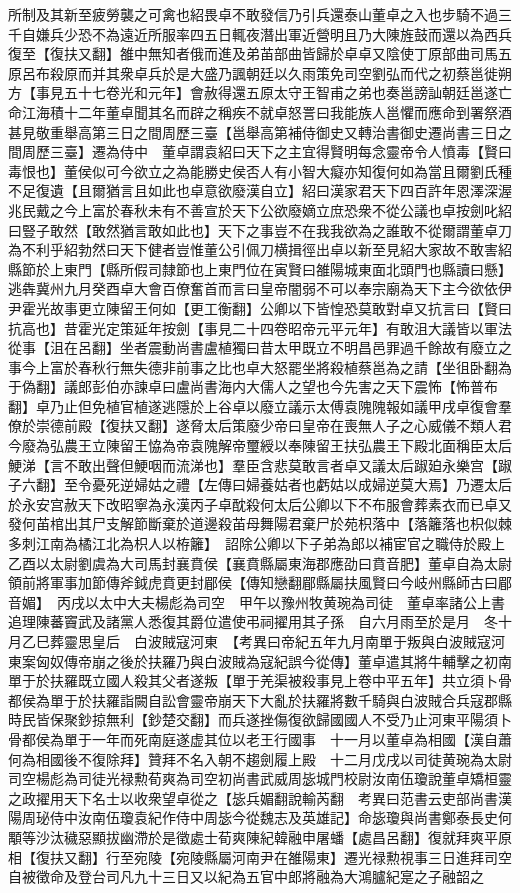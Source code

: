 所制及其新至疲勞襲之可禽也紹畏卓不敢發信乃引兵還泰山董卓之入也步騎不過三千自嫌兵少恐不為遠近所服率四五日輒夜潛出軍近營明且乃大陳旌鼓而還以為西兵復至【復扶又翻】雒中無知者俄而進及弟苖部曲皆歸於卓卓又陰使丁原部曲司馬五原呂布殺原而并其衆卓兵於是大盛乃諷朝廷以久雨策免司空劉弘而代之初蔡邕徙朔方【事見五十七卷光和元年】會赦得還五原太守王智甫之弟也奏邕謗訕朝廷邕遂亡命江海積十二年董卓聞其名而辟之稱疾不就卓怒詈曰我能族人邕懼而應命到署祭酒甚見敬重舉高第三日之間周歷三臺【邕舉高第補侍御史又轉治書御史遷尚書三日之間周歷三臺】遷為侍中　董卓謂袁紹曰天下之主宜得賢明每念靈帝令人憤毒【賢曰毒恨也】董侯似可今欲立之為能勝史侯否人有小智大癡亦知復何如為當且爾劉氏種不足復遺【且爾猶言且如此也卓意欲廢漢自立】紹曰漢家君天下四百許年恩澤深渥兆民戴之今上富於春秋未有不善宣於天下公欲廢嫡立庶恐衆不從公議也卓按劍叱紹曰豎子敢然【敢然猶言敢如此也】天下之事豈不在我我欲為之誰敢不從爾謂董卓刀為不利乎紹勃然曰天下健者豈惟董公引佩刀横揖徑出卓以新至見紹大家故不敢害紹縣節於上東門【縣所假司隸節也上東門位在寅賢曰雒陽城東面北頭門也縣讀曰懸】逃犇冀州九月癸酉卓大會百僚奮首而言曰皇帝闇弱不可以奉宗廟為天下主今欲依伊尹霍光故事更立陳留王何如【更工衡翻】公卿以下皆惶恐莫敢對卓又抗言曰【賢曰抗高也】昔霍光定策延年按劍【事見二十四卷昭帝元平元年】有敢沮大議皆以軍法從事【沮在呂翻】坐者震動尚書盧植獨曰昔太甲既立不明昌邑罪過千餘故有廢立之事今上富於春秋行無失德非前事之比也卓大怒罷坐將殺植蔡邕為之請【坐徂卧翻為于偽翻】議郎彭伯亦諫卓曰盧尚書海内大儒人之望也今先害之天下震怖【怖普布翻】卓乃止但免植官植遂逃隱於上谷卓以廢立議示太傅袁隗隗報如議甲戌卓復會羣僚於崇德前殿【復扶又翻】遂脅太后策廢少帝曰皇帝在喪無人子之心威儀不類人君今廢為弘農王立陳留王恊為帝袁隗解帝璽綬以奉陳留王扶弘農王下殿北面稱臣太后鯁涕【言不敢出聲但鯁咽而流涕也】羣臣含悲莫敢言者卓又議太后踧廹永樂宫【踧子六翻】至令憂死逆婦姑之禮【左傳曰婦養姑者也虧姑以成婦逆莫大焉】乃遷太后於永安宫赦天下改昭寧為永漢丙子卓酖殺何太后公卿以下不布服會葬素衣而已卓又發何苖棺出其尸支解節斷棄於道邊殺苖母舞陽君棄尸於苑枳落中【落籬落也枳似棘多刺江南為橘江北為枳人以栫籬】　詔除公卿以下子弟為郎以補宦官之職侍於殿上　乙酉以太尉劉虞為大司馬封襄賁侯【襄賁縣屬東海郡應劭曰賁音肥】董卓自為太尉領前將軍事加節傳斧鉞虎賁更封郿侯【傳知戀翻郿縣屬扶風賢曰今岐州縣師古曰郿音媚】　丙戌以太中大夫楊彪為司空　甲午以豫州牧黄琬為司徒　董卓率諸公上書追理陳蕃竇武及諸黨人悉復其爵位遣使弔祠擢用其子孫　自六月雨至於是月　冬十月乙巳葬靈思皇后　白波賊寇河東　【考異曰帝紀五年九月南單于叛與白波賊寇河東案匈奴傳帝崩之後於扶羅乃與白波賊為寇紀誤今從傳】董卓遣其將牛輔擊之初南單于於扶羅既立國人殺其父者遂叛【單于羌渠被殺事見上卷中平五年】共立須卜骨都侯為單于於扶羅詣闕自訟會靈帝崩天下大亂於扶羅將數千騎與白波賊合兵寇郡縣時民皆保聚鈔掠無利【鈔楚交翻】而兵遂挫傷復欲歸國國人不受乃止河東平陽須卜骨都侯為單于一年而死南庭遂虚其位以老王行國事　十一月以董卓為相國【漢自蕭何為相國後不復除拜】贊拜不名入朝不趨劍履上殿　十二月戊戌以司徒黄琬為太尉司空楊彪為司徒光禄勲荀爽為司空初尚書武威周毖城門校尉汝南伍瓊說董卓矯桓靈之政擢用天下名士以收衆望卓從之【毖兵媚翻說輸芮翻　考異曰范書云吏部尚書漢陽周珌侍中汝南伍瓊袁紀作侍中周毖今從魏志及英雄記】命毖瓊與尚書鄭泰長史何顒等沙汰穢惡顯拔幽滯於是徵處士荀爽陳紀韓融申屠蟠【處昌呂翻】復就拜爽平原相【復扶又翻】行至宛陵【宛陵縣屬河南尹在雒陽東】遷光禄勲視事三日進拜司空自被徵命及登台司凡九十三日又以紀為五官中郎將融為大鴻臚紀寔之子融韶之